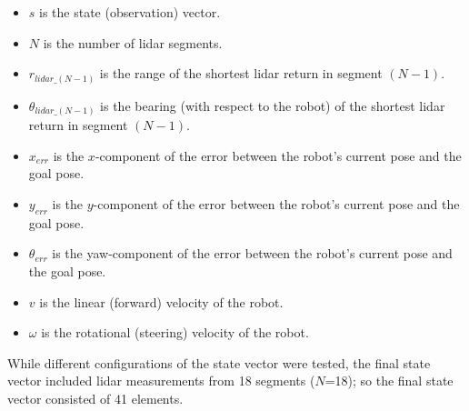 \documentclass[conference]{IEEEtran}
\begin{document}
        \begin{itemize}
            \item $s$ is the state (observation) vector.
            \item $N$ is the number of lidar segments.
            \item $r_{lidar\_(N-1)}$ is the range of the shortest lidar return in segment $(N-1)$.
            \item $\theta_{lidar\_(N-1)}$ is the bearing (with respect to the robot) of the shortest lidar return in segment $(N-1)$.
            \item $x_{err}$ is the $x$-component of the error between the robot's current pose and the goal pose.
            \item $y_{err}$ is the $y$-component of the error between the robot's current pose and the goal pose.
            \item $\theta_{err}$ is the yaw-component of the error between the robot's current pose and the goal pose.
            \item $v$ is the linear (forward) velocity of the robot.
            \item $\omega$ is the rotational (steering) velocity of the robot.
        \end{itemize}
        While different configurations of the state vector were tested, the final state vector included lidar measurements from 18 segments ($N$=18); so the final state vector consisted of 41 elements.
        
\end{document}
